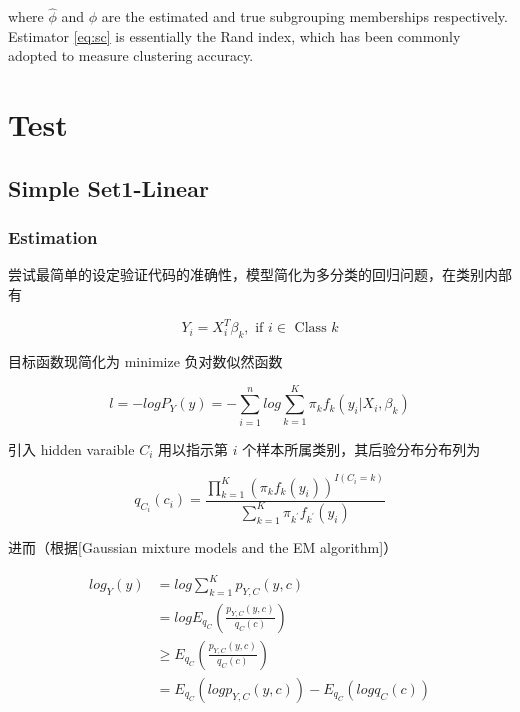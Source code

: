 \documentclass[12pt, a4paper, oneside]{article}
\numberwithin{equation}{section}
\begin{document}
where $\hat\phi$ and $\phi$ are the estimated and true subgrouping memberships respectively. Estimator \ref{eq:sc} is essentially the Rand index, which has been
commonly adopted to measure clustering accuracy.


\section{Test}

\subsection{Simple Set1-Linear}
\label{subsec:test-set1}

\subsubsection{Estimation}

尝试最简单的设定验证代码的准确性，模型简化为多分类的回归问题，在类别内部有

\begin{equation}
	Y_i = X_i^T \beta_k, \text{ if } i \in \text{ Class }k
\end{equation}

目标函数现简化为 minimize 负对数似然函数

\begin{equation}
	l = -log P_Y (y)  = -\sum_{i = 1}^{n} log\sum_{k=1}^K \pi_k f_k(y_i|X_i,\beta_k)
\end{equation}

引入 hidden varaible $C_i$ 用以指示第 $i$ 个样本所属类别，其后验分布分布列为

\begin{equation}
	q_{C_i}(c_i) = \frac{\displaystyle\prod_{k=1}^{K}{\left(\pi_k f_k(y_i)\right)^{I(C_i=k)}}}{\displaystyle\sum_{k=1}^{K}\pi_{k^\prime} f_{k^\prime}(y_i)}
\end{equation}

进而（根据[Gaussian mixture models and the EM algorithm]）

\begin{equation}
	\begin{aligned}
	log_Y (y)  &= log \sum_{k = 1}^{K}p_{Y,C}(y,c) \\
	&= log E_{q_C}\left(\frac{p_{Y,C}(y,c)}{q_C(c)}\right) \\
	&\geq E_{q_C}\left(\frac{p_{Y,C}(y,c)}{q_C(c)}\right) \\
	&= E_{q_C} \left(log p_{Y,C}(y,c)\right) - E_{q_C}\left(log q_C(c)\right)
	\end{aligned}
\end{equation}
\end{document}

